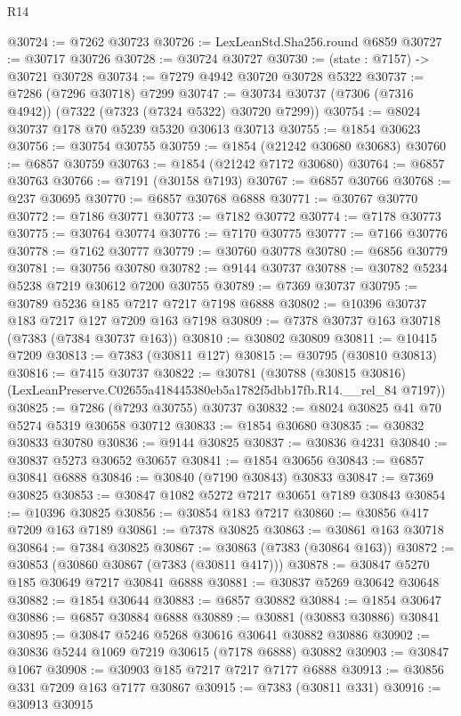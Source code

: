 \begin{lexlean}{R14}
\begin{coremodule}
@30724 := @7262 @30723
@30726 := LexLeanStd.Sha256.round @6859
@30727 := @30717 @30726
@30728 := @30724 @30727
@30730 := (state : @7157) -> @30721 @30728
@30734 := @7279 @4942 @30720 @30728 @5322
@30737 := @7286 (@7296 @30718) @7299
@30747 := @30734 @30737 (@7306 (@7316 @4942)) (@7322 (@7323 (@7324 @5322) @30720 @7299))
@30754 := @8024 @30737 @178 @70 @5239 @5320 @30613 @30713
@30755 := @1854 @30623
@30756 := @30754 @30755
@30759 := @1854 (@21242 @30680 @30683)
@30760 := @6857 @30759
@30763 := @1854 (@21242 @7172 @30680)
@30764 := @6857 @30763
@30766 := @7191 (@30158 @7193)
@30767 := @6857 @30766
@30768 := @237 @30695
@30770 := @6857 @30768 @6888
@30771 := @30767 @30770
@30772 := @7186 @30771
@30773 := @7182 @30772
@30774 := @7178 @30773
@30775 := @30764 @30774
@30776 := @7170 @30775
@30777 := @7166 @30776
@30778 := @7162 @30777
@30779 := @30760 @30778
@30780 := @6856 @30779
@30781 := @30756 @30780
@30782 := @9144 @30737
@30788 := @30782 @5234 @5238 @7219 @30612 @7200 @30755
@30789 := @7369 @30737
@30795 := @30789 @5236 @185 @7217 @7217 @7198 @6888
@30802 := @10396 @30737 @183 @7217 @127 @7209 @163 @7198
@30809 := @7378 @30737 @163 @30718 (@7383 (@7384 @30737 @163))
@30810 := @30802 @30809
@30811 := @10415 @7209
@30813 := @7383 (@30811 @127)
@30815 := @30795 (@30810 @30813)
@30816 := @7415 @30737
@30822 := @30781
    (@30788 (@30815 @30816) (LexLeanPreserve.C02655a418445380eb5a1782f5dbb17fb.R14.__rel_84 @7197))
@30825 := @7286 (@7293 @30755) @30737
@30832 := @8024 @30825 @41 @70 @5274 @5319 @30658 @30712
@30833 := @1854 @30680
@30835 := @30832 @30833 @30780
@30836 := @9144 @30825
@30837 := @30836 @4231
@30840 := @30837 @5273 @30652 @30657
@30841 := @1854 @30656
@30843 := @6857 @30841 @6888
@30846 := @30840 (@7190 @30843) @30833
@30847 := @7369 @30825
@30853 := @30847 @1082 @5272 @7217 @30651 @7189 @30843
@30854 := @10396 @30825
@30856 := @30854 @183 @7217
@30860 := @30856 @417 @7209 @163 @7189
@30861 := @7378 @30825
@30863 := @30861 @163 @30718
@30864 := @7384 @30825
@30867 := @30863 (@7383 (@30864 @163))
@30872 := @30853 (@30860 @30867 (@7383 (@30811 @417)))
@30878 := @30847 @5270 @185 @30649 @7217 @30841 @6888
@30881 := @30837 @5269 @30642 @30648
@30882 := @1854 @30644
@30883 := @6857 @30882
@30884 := @1854 @30647
@30886 := @6857 @30884 @6888
@30889 := @30881 (@30883 @30886) @30841
@30895 := @30847 @5246 @5268 @30616 @30641 @30882 @30886
@30902 := @30836 @5244 @1069 @7219 @30615 (@7178 @6888) @30882
@30903 := @30847 @1067
@30908 := @30903 @185 @7217 @7217 @7177 @6888
@30913 := @30856 @331 @7209 @163 @7177 @30867
@30915 := @7383 (@30811 @331)
@30916 := @30913 @30915

\end{coremodule}
\end{lexlean}
